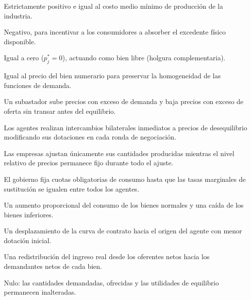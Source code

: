\begin{opts}
    \item Estrictamente positivo e igual al costo medio mínimo de producción de la industria.
    \item Negativo, para incentivar a los consumidores a absorber el excedente físico disponible.
    \item Igual a cero ($p_j^* = 0$), actuando como bien libre (holgura complementaria).
    \item Igual al precio del bien numerario para preservar la homogeneidad de las funciones de demanda.
\end{opts}

\begin{opts}
    \item Un subastador sube precios con exceso de demanda y baja precios con exceso de oferta sin transar antes del equilibrio.
    \item Los agentes realizan intercambios bilaterales inmediatos a precios de desequilibrio modificando sus dotaciones en cada ronda de negociación.
    \item Las empresas ajustan únicamente sus cantidades producidas mientras el nivel relativo de precios permanece fijo durante todo el ajuste.
    \item El gobierno fija cuotas obligatorias de consumo hasta que las tasas marginales de sustitución se igualen entre todos los agentes.
\end{opts}

\begin{opts}
    \item Un aumento proporcional del consumo de los bienes normales y una caída de los bienes inferiores.
    \item Un desplazamiento de la curva de contrato hacia el origen del agente con menor dotación inicial.
    \item Una redistribución del ingreso real desde los oferentes netos hacia los demandantes netos de cada bien.
    \item Nulo: las cantidades demandadas, ofrecidas y las utilidades de equilibrio permanecen inalteradas.
\end{opts}

